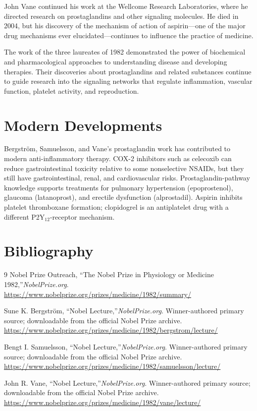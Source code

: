 John Vane continued his work at the Wellcome Research Laboratories, where he directed research on prostaglandins and other signaling molecules. He died in 2004, but his discovery of the mechanism of action of aspirin---one of the major drug mechanisms ever elucidated---continues to influence the practice of medicine.

The work of the three laureates of 1982 demonstrated the power of biochemical and pharmacological approaches to understanding disease and developing therapies. Their discoveries about prostaglandins and related substances continue to guide research into the signaling networks that regulate inflammation, vascular function, platelet activity, and reproduction.


\section{Modern Developments}

Bergstr\"om, Samuelsson, and Vane's prostaglandin work has contributed to modern anti-inflammatory therapy. COX-2 inhibitors such as celecoxib can reduce gastrointestinal toxicity relative to some nonselective NSAIDs, but they still have gastrointestinal, renal, and cardiovascular risks. Prostaglandin-pathway knowledge supports treatments for pulmonary hypertension (epoprostenol), glaucoma (latanoprost), and erectile dysfunction (alprostadil). Aspirin inhibits platelet thromboxane formation; clopidogrel is an antiplatelet drug with a different P2Y$_{12}$-receptor mechanism.


\section{Bibliography}

\begin{thebibliography}{9}
Nobel Prize Outreach, ``The Nobel Prize in Physiology or Medicine 1982,''\emph{NobelPrize.org}.\\
\url{https://www.nobelprize.org/prizes/medicine/1982/summary/}

Sune K. Bergstr\"om, ``Nobel Lecture,''\emph{NobelPrize.org}. Winner-authored primary source; downloadable from the official Nobel Prize archive.\\
\url{https://www.nobelprize.org/prizes/medicine/1982/bergstrom/lecture/}

Bengt I. Samuelsson, ``Nobel Lecture,''\emph{NobelPrize.org}. Winner-authored primary source; downloadable from the official Nobel Prize archive.\\
\url{https://www.nobelprize.org/prizes/medicine/1982/samuelsson/lecture/}

John R. Vane, ``Nobel Lecture,''\emph{NobelPrize.org}. Winner-authored primary source; downloadable from the official Nobel Prize archive.\\
\url{https://www.nobelprize.org/prizes/medicine/1982/vane/lecture/}
\end{thebibliography}
